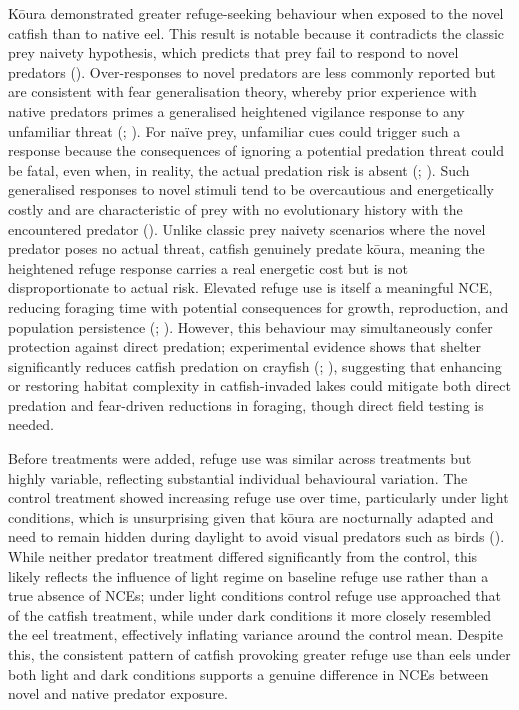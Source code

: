\documentclass[
  letterpaper,
  DIV=11,
  numbers=noendperiod]{scrartcl}
\begin{document}
Kōura demonstrated greater refuge-seeking behaviour when exposed to the
novel catfish than to native eel. This result is notable because it
contradicts the classic prey naivety hypothesis, which predicts that
prey fail to respond to novel predators
(). Over-responses to
novel predators are less commonly reported but are consistent with fear
generalisation theory, whereby prior experience with native predators
primes a generalised heightened vigilance response to any unfamiliar
threat (;
). For naïve prey, unfamiliar
cues could trigger such a response because the consequences of ignoring
a potential predation threat could be fatal, even when, in reality, the
actual predation risk is absent (; ). Such
generalised responses to novel stimuli tend to be overcautious and
energetically costly and are characteristic of prey with no evolutionary
history with the encountered predator (). Unlike classic prey naivety scenarios where the novel
predator poses no actual threat, catfish genuinely predate kōura,
meaning the heightened refuge response carries a real energetic cost but
is not disproportionate to actual risk. Elevated refuge use is itself a
meaningful NCE, reducing foraging time with potential consequences for
growth, reproduction, and population persistence
(;
). However, this
behaviour may simultaneously confer protection against direct predation;
experimental evidence shows that shelter significantly reduces catfish
predation on crayfish (;
), suggesting that enhancing
or restoring habitat complexity in catfish-invaded lakes could mitigate
both direct predation and fear-driven reductions in foraging, though
direct field testing is needed.

Before treatments were added, refuge use was similar across treatments
but highly variable, reflecting substantial individual behavioural
variation. The control treatment showed increasing refuge use over time,
particularly under light conditions, which is unsurprising given that
kōura are nocturnally adapted and need to remain hidden during daylight
to avoid visual predators such as birds
(). While neither predator
treatment differed significantly from the control, this likely reflects
the influence of light regime on baseline refuge use rather than a true
absence of NCEs; under light conditions control refuge use approached
that of the catfish treatment, while under dark conditions it more
closely resembled the eel treatment, effectively inflating variance
around the control mean. Despite this, the consistent pattern of catfish
provoking greater refuge use than eels under both light and dark
conditions supports a genuine difference in NCEs between novel and
native predator exposure.
\end{document}
